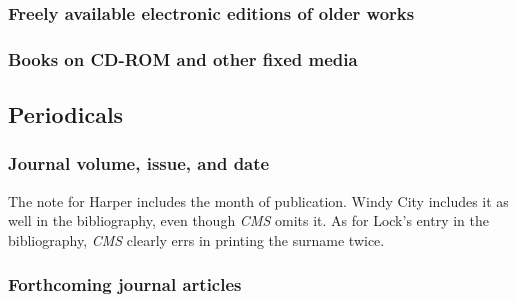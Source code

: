 \documentclass[11pt,letterpaper,oneside]{article}
\begin{document}
\subsubsection{Freely available electronic editions of older works}

\begin{citebib}
\item \cite{james2008}
\end{citebib}

\subsubsection{Books on CD-ROM and other fixed media}

\begin{citebib}
\item \cite[1.4]{chicago2003}
\end{citebib}

\setcounter{subsection}{5}
\subsection{Periodicals}
\setcounter{subsection}{14}

\setcounter{subsubsection}{170}
\subsubsection{Journal volume, issue, and date}

The note for Harper includes the month of publication. Windy City
includes it as well in the bibliography, even though \textit{CMS}
omits it. As for Lock's entry in the bibliography, \textit{CMS}
clearly errs in printing the surname twice.

\begin{citebib}
\item \cite[155]{lock2015}
\item \cite[651]{wesoky2015}
\item \cite[645]{harper2014}
\item \cite[60]{wilder2013}
\item \cite[52]{beattie1974}
\end{citebib}

\subsubsection{Forthcoming journal articles}
\end{document}
